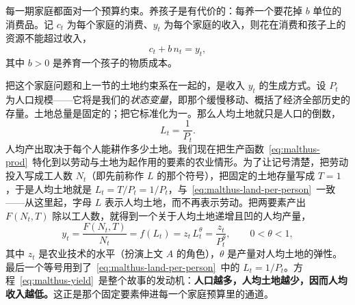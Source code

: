 每一期家庭都面对一个预算约束。养孩子是有代价的：每养一个要花掉 $b$ 单位的消费品。记 $c_t$ 为每个家庭的消费、$y_t$ 为每个家庭的收入，则花在消费和孩子上的资源不能超过收入，
\begin{equation}
c_t + b\, n_t = y_t,
\label{eq:malthus-budget}
\end{equation}
其中 $b > 0$ 是养育一个孩子的物质成本。

把这个家庭问题和上一节的土地约束系在一起的，是收入 $y_t$ 的生成方式。设 $P_t$ 为人口规模——它将是我们的\emph{状态变量}，即那个缓慢移动、概括了经济全部历史的存量。土地总量是固定的；把它标准化为一。那么人均土地就只是人口的倒数，
\begin{equation}
L_t = \frac{1}{P_t}.
\label{eq:malthus-land-per-person}
\end{equation}
人均产出取决于每个人能耕作多少土地。我们现在把生产函数~\eqref{eq:malthus-prod}~特化到以劳动与土地为起作用的要素的农业情形。为了让记号清楚，把劳动投入写成工人数 $N_t$（即先前称作 $L$ 的那个符号），把固定的土地存量写成 $T=1$，于是人均土地就是 $L_t = T/P_t = 1/P_t$，与~\eqref{eq:malthus-land-per-person}~一致——从这里起，字母 $L$ 表示人均土地，而不再表示劳动。把两要素产出 $F(N_t, T)$ 除以工人数，就得到一个关于人均土地递增且凹的人均产量，
\begin{equation}
y_t = \frac{F(N_t, T)}{N_t} = f(L_t) = z_t\, L_t^{\theta} = \frac{z_t}{P_t^{\theta}},
\qquad 0 < \theta < 1,
\label{eq:malthus-yield}
\end{equation}
其中 $z_t$ 是农业技术的水平（扮演上文 $A$ 的角色），$\theta$ 是产量对人均土地的弹性。最后一个等号用到了~\eqref{eq:malthus-land-per-person}~中的 $L_t = 1/P_t$。方程~\eqref{eq:malthus-yield}~是整个故事的发动机：\textbf{人口越多，人均土地越少，因而人均收入越低。}这正是那个固定要素伸进每一个家庭预算里的通道。


